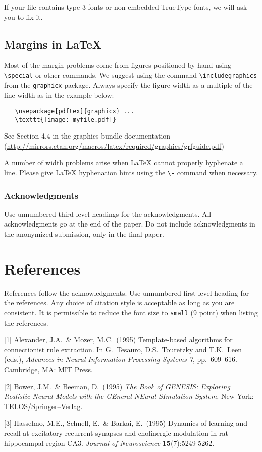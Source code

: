 \documentclass{article}
\begin{document}
If your file contains type 3 fonts or non embedded TrueType fonts, we will ask
you to fix it.

\subsection{Margins in \LaTeX{}}

Most of the margin problems come from figures positioned by hand using
\verb+\special+ or other commands. We suggest using the command
\verb+\includegraphics+ from the \verb+graphicx+ package. Always specify the
figure width as a multiple of the line width as in the example below:
\begin{verbatim}
   \usepackage[pdftex]{graphicx} ...
   \texttt{[image: myfile.pdf]}
\end{verbatim}
See Section 4.4 in the graphics bundle documentation
(\url{http://mirrors.ctan.org/macros/latex/required/graphics/grfguide.pdf})

A number of width problems arise when \LaTeX{} cannot properly hyphenate a
line. Please give LaTeX hyphenation hints using the \verb+\-+ command when
necessary.

\subsubsection*{Acknowledgments}

Use unnumbered third level headings for the acknowledgments. All acknowledgments
go at the end of the paper. Do not include acknowledgments in the anonymized
submission, only in the final paper.

\section*{References}

References follow the acknowledgments. Use unnumbered first-level heading for
the references. Any choice of citation style is acceptable as long as you are
consistent. It is permissible to reduce the font size to \verb+small+ (9 point)
when listing the references.
\medskip

\small

[1] Alexander, J.A.\ \& Mozer, M.C.\ (1995) Template-based algorithms for
connectionist rule extraction. In G.\ Tesauro, D.S.\ Touretzky and T.K.\ Leen
(eds.), {\it Advances in Neural Information Processing Systems 7},
pp.\ 609--616. Cambridge, MA: MIT Press.

[2] Bower, J.M.\ \& Beeman, D.\ (1995) {\it The Book of GENESIS: Exploring
  Realistic Neural Models with the GEneral NEural SImulation System.}  New York:
TELOS/Springer--Verlag.

[3] Hasselmo, M.E., Schnell, E.\ \& Barkai, E.\ (1995) Dynamics of learning and
recall at excitatory recurrent synapses and cholinergic modulation in rat
hippocampal region CA3. {\it Journal of Neuroscience} {\bf 15}(7):5249-5262.
\end{document}
